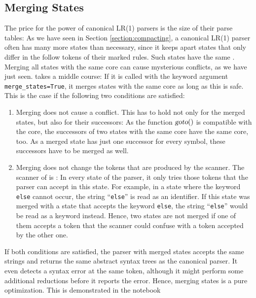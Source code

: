 \subsection{Merging States \label{section:merging-states}}
The price for the power of canonical LR(1) parsers is the size of their parse tables:  As we have seen in
Section \ref{section:compacting}, a canonical LR(1) parser often has many more states than necessary, since it
keeps apart states that only differ in the follow tokens of their marked rules.  Such states have the same
.  Merging all states with the same core can cause
mysterious conflicts, as we have just seen.   takes a middle course:
If it is called with the keyword argument \texttt{merge\_states=True}, it merges states with the same core as long
as this is safe.  This is the case if the following two conditions are satisfied:
\begin{enumerate}
\item Merging does not cause a conflict.  This has to hold not only for the merged states, but also for their
      successors:  As the function $\textsl{goto}()$ is compatible with the core, the successors of two states with
      the same core have the same core, too.  As a merged state has just one successor for every symbol, these
      successors have to be merged as well.
\item Merging does not change the tokens that are produced by the scanner.  The scanner of 
      is :  In every state of the parser, it only tries those tokens
      that the parser can accept in this state.  For example, in a state where the keyword \texttt{else} cannot
      occur, the string ``\texttt{else}'' is read as an identifier.  If this state was merged with a state that
      accepts the keyword \texttt{else}, the string ``\texttt{else}'' would be read as a keyword instead.  Hence,
      two states are not merged if one of them accepts a token that the scanner could confuse with a token
      accepted by the other one.
\end{enumerate}
If both conditions are satisfied, the parser with merged states accepts the same strings and returns the same
abstract syntax trees as the canonical parser.  It even detects a syntax error at the same token, although it
might perform some additional reductions before it reports the error.  Hence, merging states is a pure
optimization.  This is demonstrated in the notebook
\\[0.2cm]
